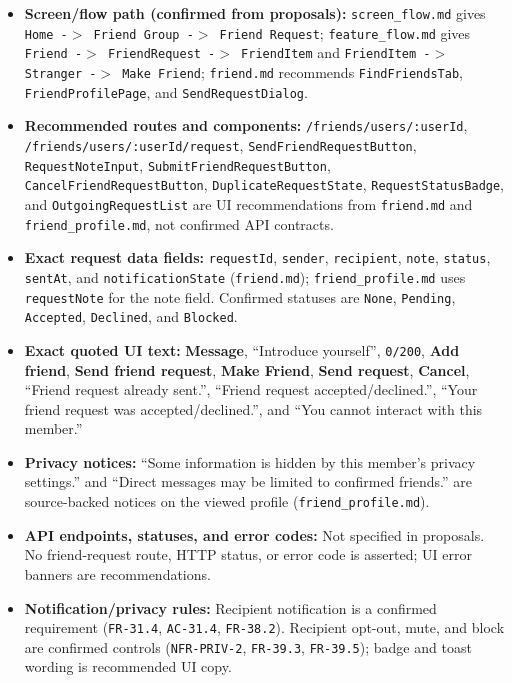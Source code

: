 \documentclass[12pt]{article}
\begin{document}
\begin{itemize}
\item \textbf{Screen/flow path (confirmed from proposals):} \texttt{screen\_flow.md} gives \texttt{Home -$>$ Friend Group -$>$ Friend Request}; \texttt{feature\_flow.md} gives \texttt{Friend -$>$ FriendRequest -$>$ FriendItem} and \texttt{FriendItem -$>$ Stranger -$>$ Make Friend}; \texttt{friend.md} recommends \texttt{FindFriendsTab}, \texttt{FriendProfilePage}, and \texttt{SendRequestDialog}.
\item \textbf{Recommended routes and components:} \texttt{/friends/users/:userId}, \texttt{/friends/users/:userId/request}, \texttt{SendFriendRequestButton}, \texttt{RequestNoteInput}, \texttt{SubmitFriendRequestButton}, \texttt{CancelFriendRequestButton}, \texttt{DuplicateRequestState}, \texttt{RequestStatusBadge}, and \texttt{OutgoingRequestList} are UI recommendations from \texttt{friend.md} and \texttt{friend\_profile.md}, not confirmed API contracts.
\item \textbf{Exact request data fields:} \texttt{requestId}, \texttt{sender}, \texttt{recipient}, \texttt{note}, \texttt{status}, \texttt{sentAt}, and \texttt{notificationState} (\texttt{friend.md}); \texttt{friend\_profile.md} uses \texttt{requestNote} for the note field. Confirmed statuses are \texttt{None}, \texttt{Pending}, \texttt{Accepted}, \texttt{Declined}, and \texttt{Blocked}.
\item \textbf{Exact quoted UI text:} \textbf{Message}, “Introduce yourself”, \texttt{0/200}, \textbf{Add friend}, \textbf{Send friend request}, \textbf{Make Friend}, \textbf{Send request}, \textbf{Cancel}, “Friend request already sent.”, “Friend request accepted/declined.”, “Your friend request was accepted/declined.”, and “You cannot interact with this member.”
\item \textbf{Privacy notices:} “Some information is hidden by this member's privacy settings.” and “Direct messages may be limited to confirmed friends.” are source-backed notices on the viewed profile (\texttt{friend\_profile.md}).
\item \textbf{API endpoints, statuses, and error codes:} Not specified in proposals. No friend-request route, HTTP status, or error code is asserted; UI error banners are recommendations.
\item \textbf{Notification/privacy rules:} Recipient notification is a confirmed requirement (\texttt{FR-31.4}, \texttt{AC-31.4}, \texttt{FR-38.2}). Recipient opt-out, mute, and block are confirmed controls (\texttt{NFR-PRIV-2}, \texttt{FR-39.3}, \texttt{FR-39.5}); badge and toast wording is recommended UI copy.
\end{itemize}
\par\medskip
\end{document}
